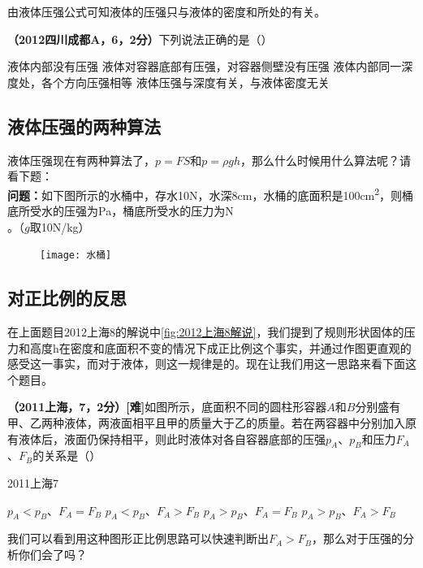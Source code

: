 \documentclass[12pt]{exam}%
\begin{document}
\begin{knowledge}
由液体压强公式可知液体的压强只与液体的密度和所处的\answerline*[深度]有关。


\textbf{（2012四川成都A，6，2分）}下列说法正确的是（\answerline*[C]）
\begin{choices}
\choice 液体内部没有压强
\choice 液体对容器底部有压强，对容器侧壁没有压强
\choice 液体内部同一深度处，各个方向压强相等
\choice 液体压强与深度有关，与液体密度无关
\end{choices}


\subsection{液体压强的两种算法}
液体压强现在有两种算法了，$p=FS$和$p=\rho gh$，那么什么时候用什么算法呢？请看下题：\\
\textbf{问题：}如下图所示的水桶中，存水10N，水深8cm，水桶的底面积是\si{100cm^2}，则桶底所受水的压强为\answerline*[800]Pa，桶底所受水的压力为\answerline*[8]N\\。（$g$取10N/kg）
\begin{figure}[H]
\texttt{[image: 水桶]}
\end{figure}



\subsection{对正比例的反思}
在上面题目2012上海8的解说中\ref{fig:2012上海8解说}，我们提到了规则形状固体的压力和高度h在密度和底面积不变的情况下成正比例这个事实，并通过作图更直观的感受这一事实，而对于液体，则这一规律是的。现在让我们用这一思路来看下面这个题目。

\textbf{（2011上海，7，2分）[难]}如图所示，底面积不同的圆柱形容器$A$和$B$分别盛有甲、乙两种液体，两液面相平且甲的质量大于乙的质量。若在两容器中分别加入原有液体后，液面仍保持相平，则此时液体对各自容器底部的压强$p_A$、$p_B$和压力$F_A$、$F_B$的关系是（\answerline*[D]）
\begin{multicols}{2}
\begin{linefig}{2011上海7}
\end{linefig}
\columnbreak
\begin{choices}
\choice $p_A<p_B$、$F_A=F_B$
\choice $p_A<p_B$、$F_A>F_B$
\choice $p_A>p_B$、$F_A=F_B$
\choice $p_A>p_B$、$F_A>F_B$
\end{choices}
\end{multicols}

我们可以看到用这种图形正比例思路可以快速判断出$F_A>F_B$，那么对于压强的分析你们会了吗？


\end{knowledge}
\end{document}
